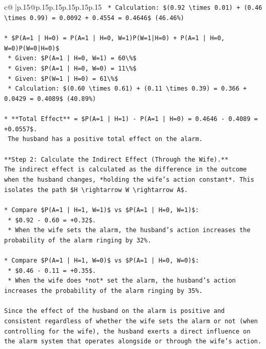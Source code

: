 \documentclass{article}
\begin{document}
{\begin{supertabular}{c@{$\;$}|p{.15\linewidth}@{}p{.15\linewidth}p{.15\linewidth}p{.15\linewidth}p{.15\linewidth}p{.15\linewidth}}
{{{\texttt{    *   Calculation: \$(0.92 \textbackslash{}times 0.01) + (0.46 \textbackslash{}times 0.99) = 0.0092 + 0.4554 = 0.4646\$ (46.46\%)} \\
\\ 
\texttt{*   \$P(A=1 | H=0) = P(A=1 | H=0, W=1)P(W=1|H=0) + P(A=1 | H=0, W=0)P(W=0|H=0)\$} \\
\texttt{    *   Given: \$P(A=1 | H=0, W=1) = 60\textbackslash{}\%\$} \\
\texttt{    *   Given: \$P(A=1 | H=0, W=0) = 11\textbackslash{}\%\$} \\
\texttt{    *   Given: \$P(W=1 | H=0) = 61\textbackslash{}\%\$} \\
\texttt{    *   Calculation: \$(0.60 \textbackslash{}times 0.61) + (0.11 \textbackslash{}times 0.39) = 0.366 + 0.0429 = 0.4089\$ (40.89\%)} \\
\\ 
\texttt{*   **Total Effect** = \$P(A=1 | H=1) {-} P(A=1 | H=0) = 0.4646 {-} 0.4089 = +0.0557\$.} \\
\texttt{    The husband has a positive total effect on the alarm.} \\
\\ 
\texttt{**Step 2: Calculate the Indirect Effect (Through the Wife).**} \\
\texttt{The indirect effect is calculated as the difference in the outcome when the husband changes, *holding the wife's action constant*. This isolates the path \$H \textbackslash{}rightarrow W \textbackslash{}rightarrow A\$.} \\
\\ 
\texttt{*   Compare \$P(A=1 | H=1, W=1)\$ vs \$P(A=1 | H=0, W=1)\$:} \\
\texttt{    *   \$0.92 {-} 0.60 = +0.32\$.} \\
\texttt{    *   When the wife sets the alarm, the husband's action increases the probability of the alarm ringing by 32\%.} \\
\\ 
\texttt{*   Compare \$P(A=1 | H=1, W=0)\$ vs \$P(A=1 | H=0, W=0)\$:} \\
\texttt{    *   \$0.46 {-} 0.11 = +0.35\$.} \\
\texttt{    *   When the wife does *not* set the alarm, the husband's action increases the probability of the alarm ringing by 35\%.} \\
\\ 
\texttt{Since the effect of the husband on the alarm is positive and consistent regardless of whether the wife sets the alarm or not (when controlling for the wife), the husband exerts a direct influence on the alarm system that operates alongside or through the wife's action.} \\
}}}
\end{supertabular}}
\end{document}
